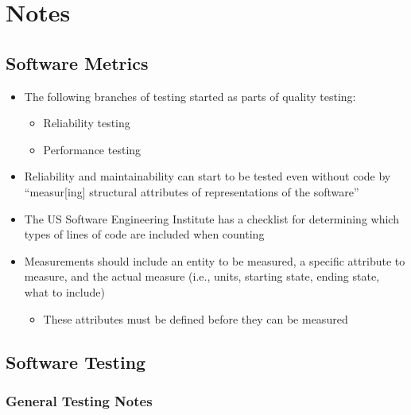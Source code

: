 \chapter{Notes}
\label{chap:notes}

\section{Software Metrics}
\label{chap:notes:sec:software-metrics}

\begin{itemize}
      \item The following branches of testing started as parts of quality
            testing:
            \begin{itemize}
                  \item Reliability testing \cite[p.~18, ch.~10]{fenton_software_1997}
                  \item Performance testing \cite[p.~18, ch.~7]{fenton_software_1997}
            \end{itemize}
      \item Reliability and maintainability can start to be tested even without
            code by ``measur[ing] structural attributes of representations of the
            software'' \cite[p.~18]{fenton_software_1997}
      \item The US Software Engineering Institute has a checklist for determining
            which types of lines of code are included when counting
            \cite[pp.~30-31]{fenton_software_1997}
      \item Measurements should include an entity to be measured, a specific
            attribute to measure, and the actual measure (i.e., units, starting
            state, ending state, what to include) \cite[p.~36]{fenton_software_1997}
            \begin{itemize}
                  \item These attributes must be defined before they can be
                        measured \cite[p.~38]{fenton_software_1997}
            \end{itemize}
\end{itemize}

\section{Software Testing}
\label{chap:notes:sec:software-testing}

\subsection{General Testing Notes}


